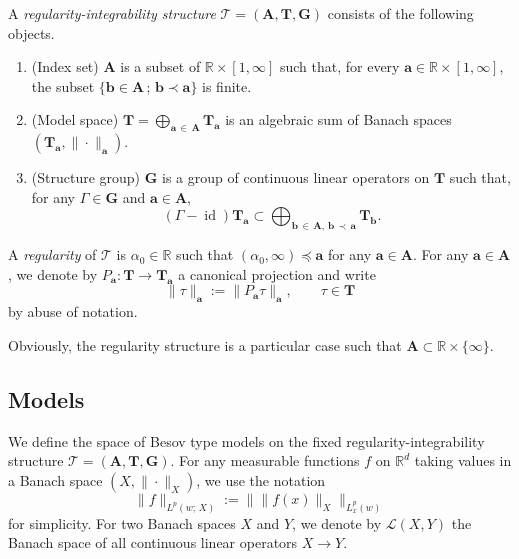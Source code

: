 \documentclass[AHL,Unicode,longabstracts,published]{cedram}
\newcommand{\bbR}{\mathbb{R}}
\newcommand{\bfa}{\mathbf{a}}
\newcommand{\bfb}{\mathbf{b}}
\newcommand{\bfA}{\mathbf{A}}
\newcommand{\bfT}{\mathbf{T}}
\newcommand{\bfG}{\mathbf{G}}
\newcommand{\mcL}{\mathcal{L}}
\newcommand{\scT}{\mathscr{T}}
\DeclareMathOperator{\id}{id}
\begin{document}
\begin{defi}
A \emph{regularity-integrability structure} $\scT=(\bfA,\bfT,\bfG)$ consists of the following objects.
\begin{enumerate}
\item (Index set) $\bfA$ is a subset of $\bbR\times[1,\infty]$ such that, for every $\bfa\in\bbR\times[1,\infty]$, the subset $\{\bfb\in \bfA\, ;\, \bfb\prec\bfa\}$ is finite.
\item (Model space) $\bfT=\bigoplus_{{\bfa}\,\in\,\bfA}\bfT_{\bfa}$ is an algebraic sum of Banach spaces $(\bfT_{\bfa},\|\cdot\|_{\bfa})$.
\item (Structure group) $\bfG$ is a group of continuous linear operators on $\bfT$ such that, for any $\Gamma\in \bfG$ and $\bfa\in\bfA$,
\[
(\Gamma-\id)\bfT_{\bfa}\subset\bigoplus_{{\bfb}\,\in \,\bfA,\, {\bfb}\,\prec \,{\bfa}}\bfT_{\bfb}.
\]
\end{enumerate}
A \emph{regularity} of $\scT$ is $\alpha_0\in\bbR$ such that $(\alpha_0,\infty)\preceq\bfa$ for any $\bfa\in \bfA$. For any $\bfa\in\bfA$, we denote by $P_{\bfa}:\bfT\to\bfT_{\bfa}$ a canonical projection and write
\[
\|\tau\|_{\bfa}:=\|P_{\bfa}\tau\|_{\bfa},\qquad\tau\in \bfT
\]
by abuse of notation.
\end{defi}

Obviously, the regularity structure is a particular case such that $\bfA\subset\bbR\times\{\infty\}$.

\subsection{Models}

We define the space of Besov type models on the fixed regularity-integrability structure $\scT=(\bfA,\bfT,\bfG)$. For any measurable functions $f$ on $\bbR^d$ taking values in a Banach space $(X,\|\cdot\|_X)$, we use the notation
\[
\|f\|_{L^p(w;\,X)}:=\big\|\|f(x)\|_X\big\|_{L_x^p(w)}
\]
for simplicity. For two Banach spaces $X$ and $Y$, we denote by $\mcL(X,Y)$ the Banach space of all continuous linear operators $X\to Y$.
\end{document}
